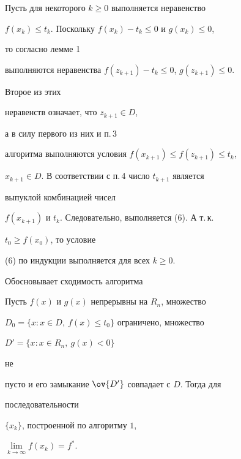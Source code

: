 


\begin{pf} 


Пусть для некоторого $k\ge 0$ выполняется неравенство 


$f(x_k)\le t_k$. Поскольку $f(x_k)-t_k\le 0$ и $g(x_k)\le 0$, 


то согласно лемме 1 


выполняются неравенства $f(z_{k+1})-t_k\le 0$, $g(z_{k+1})\le 0$. 


Второе из этих 


неравенств означает, что $z_{k+1}\in D$, 


а в силу первого из них и п.\,3 


алгоритма выполняются условия $f(x_{k+1})\le f(z_{k+1})\le t_k$, 


$x_{k+1}\in D$. В соответствии с п.\,4 число $t_{k+1}$ является 


выпуклой комбинацией чисел 


$f(x_{k+1})$ и $t_k$. Следовательно, выполняется (6). А т.\,к.{} 


$t_0\ge f(x_0)$, то условие 


(6) по индукции выполняется для всех $k\ge 0$. 


\end{pf}


 


Обосновывает сходимость алгоритма


 


\begin{thm} Пусть $f(x)$ и $g(x)$ непрерывны на $R_n$, множество 


$D_0=\{x:x\in D,\ f(x)\le t_0\}$ ограничено, множество 


$D'=\{x:x\in R_n,\ g(x)<0\}$ 


не 


пусто и его замыкание $\ov{D'}$ совпадает с $D$. Тогда для 


последовательности 


$\{x_k\}$, построенной по алгоритму $1$, 


$\lim\limits_{k\to\infty}f(x_k)=f^*$. 


\end{thm} 


 


